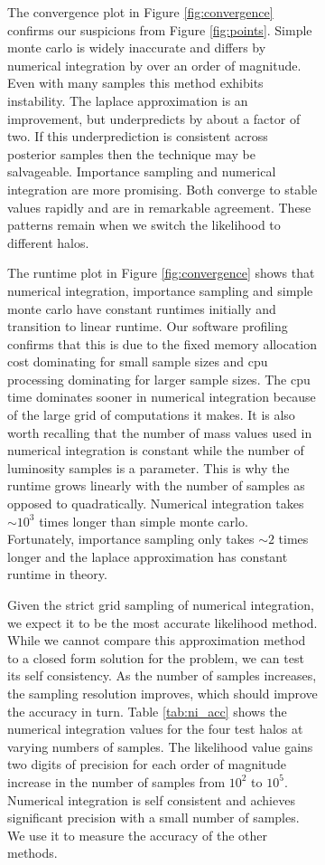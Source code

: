 \documentclass[\docopts]{\docclass}
\begin{document}
\begin{figure}[h!]
\begin{figure}[h!]
The convergence plot in Figure \ref{fig:convergence} confirms our suspicions from Figure \ref{fig:points}.
Simple monte carlo is widely inaccurate and differs by numerical integration by over an order of magnitude. 
Even with many samples this method exhibits instability.
The laplace approximation is an improvement, but underpredicts by about a factor of two.
If this underprediction is consistent across posterior samples then the technique may be salvageable. 
Importance sampling and numerical integration are more promising. 
Both converge to stable values rapidly and are in remarkable agreement.
These patterns remain when we switch the likelihood to different halos.

The runtime plot in Figure \ref{fig:convergence} shows that numerical integration, importance sampling and simple monte carlo have constant runtimes initially and transition to linear runtime. 
Our software profiling confirms that this is due to the fixed memory allocation cost dominating for small sample sizes and cpu processing dominating for larger sample sizes.
The cpu time dominates sooner in numerical integration because of the large grid of computations it makes.
It is also worth recalling that the number of mass values used in numerical integration is constant while the number of luminosity samples is a parameter.
This is why the runtime grows linearly with the number of samples as opposed to quadratically.
Numerical integration takes $\sim 10^3$ times longer than simple monte carlo. Fortunately, importance sampling only takes $\sim 2$ times longer and the laplace approximation has constant runtime in theory.

Given the strict grid sampling of numerical integration, we expect it to be the most accurate likelihood method.
While we cannot compare this approximation method to a closed form solution for the problem, we can test its self consistency.
As the number of samples increases, the sampling resolution improves, which should improve the accuracy in turn.
Table \ref{tab:ni_acc} shows the numerical integration values for the four test halos at varying numbers of samples.
The likelihood value gains two digits of precision for each order of magnitude increase in the number of samples from $10^2$ to $10^5$.
Numerical integration is self consistent and achieves significant precision with a small number of samples. We use it to measure the accuracy of the other methods.


\end{figure}
\end{figure}
\end{document}
